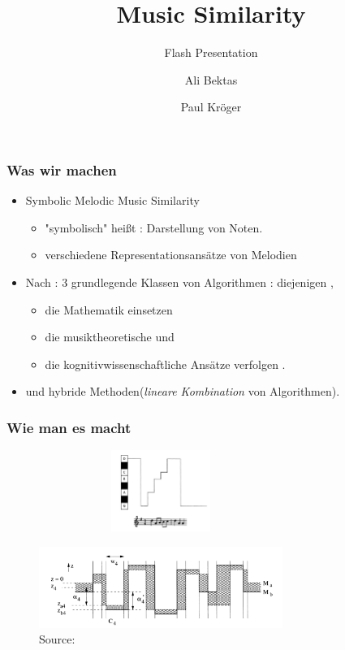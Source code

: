 \documentclass{beamer}
\title{Music Similarity}
\subtitle{Flash Presentation}
\author{Ali Bektas \and Paul Kröger}
\begin{document}
	\begin{frame}
		\maketitle
	\end{frame}
	\begin{frame}
  		\frametitle{Was wir machen}
  		\begin{itemize}
  			\item Symbolic Melodic Music Similarity 
  			\begin{itemize}
  				\item "symbolisch" heißt : Darstellung von Noten.
  				\item verschiedene Representationsansätze von Melodien 
  			\end{itemize} 
			\item Nach \cite{two} : 3 grundlegende Klassen von Algorithmen : diejenigen ,
			\begin{itemize}
				\item die Mathematik einsetzen
				\item die musiktheoretische und
				\item die kognitivwissenschaftliche Ansätze verfolgen .
			\end{itemize}
			\item und hybride Methoden(\textit{lineare Kombination} von Algorithmen).
  		\end{itemize}
	\end{frame}
	\begin{frame}
  		\frametitle{Wie man es macht}
  		\begin{figure}[h!]
					\includegraphics[width=300px,height=100px,keepaspectratio]{abb_1}
		\end{figure}
		\begin{figure}[h!]
					\includegraphics[width=300px,height=100px,keepaspectratio]{abb_2}
					\caption{Source: \cite{one}}
		\end{figure}
	\end{frame}
\end{document}
